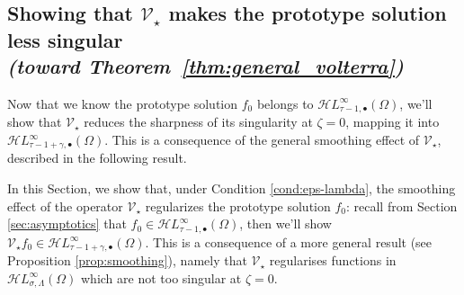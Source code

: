 \documentclass{article}
\theoremstyle{plain}
\newcommand{\singexp}[2]{\mathcal{H}L^\infty_{#1, #2}}
\newcommand{\singexpalg}[1]{\singexp{#1}{\bullet}}
\newcommand{\softpart}{\mathcal{V}_\star}
\newcommand{\solproto}{f_0}
\newcommand{\domain}{\Omega}
\begin{document}
\subsection{Showing that $\softpart$ makes the prototype solution less singular \\ \textit{(toward Theorem~\ref{thm:general_volterra})}}\label{sec:image under soft_part}
Now that we know the prototype solution $\solproto$ belongs to $\singexpalg{\tau-1}(\domain)$, we'll show that $\softpart$ reduces the sharpness of its singularity at $\zeta = 0$, mapping it into $\singexpalg{\tau-1+\gamma}(\domain)$. This is a consequence of the general smoothing effect of $\softpart$, described in the following result.
\par\color{RoyalBlue}
In this Section, we show that, under Condition \eqref{cond:eps-lambda}, the smoothing effect of the operator $\softpart$ regularizes the prototype solution $f_0$: recall from Section \ref{sec:asymptotics} that $\solproto \in \singexpalg{\tau-1}(\domain)$, then we'll show $\softpart \solproto \in\singexpalg{\tau-1+\gamma}(\domain)$. This is a consequence of a more general result (see Proposition \ref{prop:smoothing}), namely that $\softpart$ regularises functions in $\singexp{\sigma}{\Lambda}(\Omega)$ which are not too singular at $\zeta=0$.\color{black}
\end{document}
